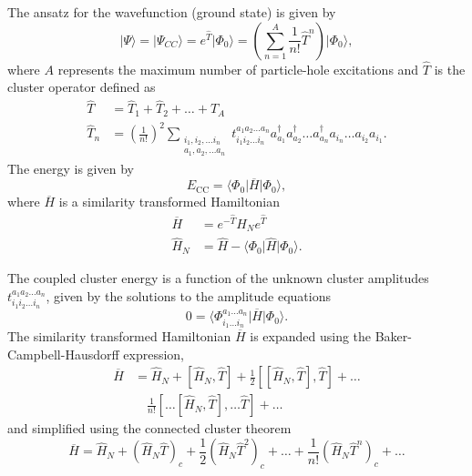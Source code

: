 The ansatz for the wavefunction (ground state) is given by
\begin{equation*}
   \vert \Psi\rangle = \vert \Psi_{CC}\rangle = e^{\hat{T}} \vert \Phi_0\rangle =  
  \left( \sum_{n=1}^{A} \frac{1}{n!} \hat{T}^n \right) \vert \Phi_0\rangle,
\end{equation*}
where $A$ represents the maximum number of particle-hole excitations and $\hat{T}$ is the cluster operator defined as
\begin{align*}
            \hat{T} &= \hat{T}_1 + \hat{T}_2 + \ldots + \hat{T}_A \\
            \hat{T}_n &= \left(\frac{1}{n!}\right)^2 
                \sum_{\substack{
                        i_1,i_2,\ldots i_n \\
                        a_1,a_2,\ldots a_n}}
                t_{i_1i_2\ldots i_n}^{a_1a_2\ldots a_n} a_{a_1}^\dagger a_{a_2}^\dagger \ldots a_{a_n}^\dagger a_{i_n} \ldots a_{i_2} a_{i_1}.
        \end{align*}
    The energy is given by
    \begin{equation*}
        E_{\mathrm{CC}} = \langle\Phi_0\vert  \overline{H}\vert \Phi_0\rangle,
    \end{equation*}
    where $\overline{H}$ is a similarity transformed Hamiltonian
    \begin{align*}
        \overline{H}&= e^{-\hat{T}} \hat{H}_N e^{\hat{T}} \\
        \hat{H}_N &= \hat{H} - \langle\Phi_0\vert \hat{H} \vert \Phi_0\rangle.
    \end{align*}

    The coupled cluster energy is a function of the unknown cluster amplitudes $t_{i_1i_2\ldots i_n}^{a_1a_2\ldots a_n}$,
given by the solutions to the amplitude equations
    \begin{equation*}
        0 = \langle\Phi_{i_1 \ldots i_n}^{a_1 \ldots a_n}\vert \overline{H}\vert \Phi_0\rangle.
    \end{equation*}
The similarity transformed   Hamiltonian  $\overline{H}$ is expanded using the Baker-Campbell-Hausdorff expression,
    \begin{align*}
        \overline{H}&= \hat{H}_N + \left[ \hat{H}_N, \hat{T} \right] + 
            \frac{1}{2} \left[\left[ \hat{H}_N, \hat{T} \right], \hat{T}\right] + \ldots \\
            & \quad \frac{1}{n!} \left[ \ldots \left[ \hat{H}_N, \hat{T} \right], \ldots \hat{T} \right] +\dots
    \end{align*}
and simplified using the connected cluster theorem
    \begin{equation*}
        \overline{H}= \hat{H}_N + \left( \hat{H}_N \hat{T}\right)_c + \frac{1}{2} \left( \hat{H}_N \hat{T}^2\right)_c
            + \dots + \frac{1}{n!} \left( \hat{H}_N \hat{T}^n\right)_c +\dots
    \end{equation*}

